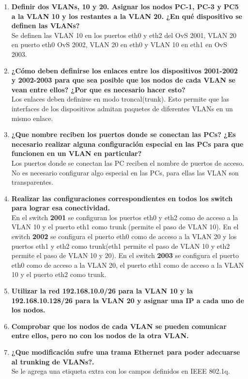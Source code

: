 \documentclass[letterpaper,12pt]{article}
\begin{document}
\begin{enumerate}
	\item \textbf{Definir dos VLANs, 10 y 20. Asignar los nodos PC-1, PC-3 y PC5 a la VLAN 10 y los restantes a la VLAN 20. ¿En qué dispositivo se definen las VLANs?}\\
	Se definen las VLAN 10 en los puertos eth0 y eth2 del OvS 2001, VLAN 20 en puerto eth0 OvS 2002, VLAN 20 en eth0 y VLAN 10 en eth1 en OvS 2003.
	\item \textbf{¿Cómo deben definirse los enlaces entre los dispositivos 2001-2002 y 2002-2003 para que sea posible que los nodos de cada VLAN se vean entre ellos? ¿Por que es necesario hacer esto?} \\
	Los enlaces deben definirse en modo troncal(trunk). Esto permite que las interfaces de los dispositivos admitan paquetes de diferentes VLANs en un mismo enlace.
	\item \textbf{¿Que nombre reciben los puertos donde se conectan las PCs? ¿Es necesario realizar alguna configuración especial en las PCs para que funcionen en un VLAN en particular?}\\
	Los puertos donde se conectan las PC reciben el nombre de puertos de acceso. No es necesario configurar algo especial en las PCs, para ellas las VLAN son transparentes.
	\item \textbf{Realizar las configuraciones correspondientes en todos los switch para lograr esa conectividad.}\\
	En el switch \textbf{2001} se configuran los puertos eth0 y eth2 como de acceso a la VLAN 10 y el puerto eth1 como trunk (permite el paso de VLAN 10). En el switch \textbf{2002} se configura el puerto eth0 como de acceso a la VLAN 20 y los puertos eth1 y eth2 como trunk(eth1 permite el paso de VLAN 10 y eth2 permite el paso de VLAN 10 y 20). En el switch \textbf{2003} se configura el puerto eth0 como de acceso a la VLAN 20, el puerto eth1 como de acceso a la VLAN 10 y el puerto eth2 como trunk.
	\item \textbf{Utilizar la red 192.168.10.0/26 para la VLAN 10 y la 192.168.10.128/26 para la VLAN 20 y asignar una IP a cada uno de los nodos.}
	\item \textbf{Comprobar que los nodos de cada VLAN se pueden comunicar entre ellos, pero no con los nodos de la otra VLAN.}
	\item \textbf{¿Que modificación sufre una trama Ethernet para poder adecuarse al trunking de VLANs?.} \\
	Se le agrega una etiqueta extra con los campos definidos en IEEE 802.1q.

\end{enumerate}
\end{document}
